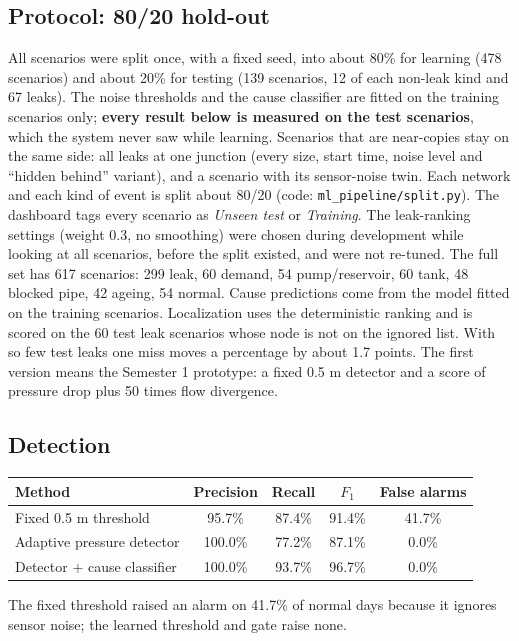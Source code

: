 \documentclass[11pt,a4paper]{article}
\newcommand{\code}[1]{\texttt{#1}}
\begin{document}
\subsection{Protocol: 80/20 hold-out}\label{sec:split}
All scenarios were split once, with a fixed seed, into about 80\% for learning (478 scenarios) and about 20\% for testing (139 scenarios, 12 of each non-leak kind and 67 leaks). The noise thresholds and the cause classifier are fitted on the training scenarios only; \textbf{every result below is measured on the test scenarios}, which the system never saw while learning. Scenarios that are near-copies stay on the same side: all leaks at one junction (every size, start time, noise level and ``hidden behind'' variant), and a scenario with its sensor-noise twin. Each network and each kind of event is split about 80/20 (code: \code{ml\_pipeline/split.py}). The dashboard tags every scenario as \emph{Unseen test} or \emph{Training}. The leak-ranking settings (weight 0.3, no smoothing) were chosen during development while looking at all scenarios, before the split existed, and were not re-tuned. The full set has 617 scenarios: 299 leak, 60 demand, 54 pump/reservoir, 60 tank, 48 blocked pipe, 42 ageing, 54 normal. Cause predictions come from the model fitted on the training scenarios. Localization uses the deterministic ranking and is scored on the 60 test leak scenarios whose node is not on the ignored list. With so few test leaks one miss moves a percentage by about 1.7 points. The first version means the Semester 1 prototype: a fixed 0.5 m detector and a score of pressure drop plus 50 times flow divergence.

\subsection{Detection}
\begin{center}\small\begin{tabular}{@{}lcccc@{}}\toprule
Method & Precision & Recall & $F_1$ & False alarms \\\midrule
Fixed 0.5 m threshold & 95.7\% & 87.4\% & 91.4\% & 41.7\% \\
Adaptive pressure detector & 100.0\% & 77.2\% & 87.1\% & 0.0\% \\
Detector + cause classifier & 100.0\% & 93.7\% & 96.7\% & 0.0\% \\
\bottomrule\end{tabular}\end{center}
The fixed threshold raised an alarm on 41.7\% of normal days because it ignores sensor noise; the learned threshold and gate raise none.
\end{document}
